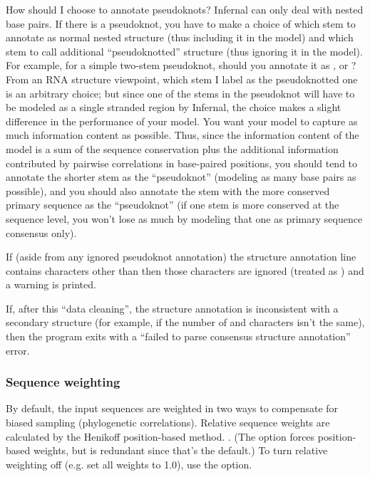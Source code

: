 \begin{srefaq}{How should I choose to annotate pseudoknots?} 
Infernal can only deal with nested base pairs. If there is
a pseudoknot, you have to make a choice of which stem to annotate as
normal nested structure (thus including it in the model) and which
stem to call additional ``pseudoknotted'' structure (thus ignoring it
in the model). For example, for a simple two-stem pseudoknot, should
you annotate it as , or
?  From an RNA structure viewpoint, which
stem I label as the pseudoknotted one is an arbitrary choice; but
since one of the stems in the pseudoknot will have to be modeled as a
single stranded region by Infernal, the choice makes a
slight difference in the performance of your model. You want your
model to capture as much information content as possible.  Thus, since
the information content of the model is a sum of the sequence
conservation plus the additional information contributed by pairwise
correlations in base-paired positions, you should tend to annotate the
shorter stem as the ``pseudoknot'' (modeling as many base pairs as
possible), and you should also annotate the stem with the more
conserved primary sequence as the ``pseudoknot'' (if one stem is more
conserved at the sequence level, you won't lose as much by modeling
that one as primary sequence consensus only).
\end{srefaq}

If (aside from any ignored pseudoknot annotation) the structure
annotation line contains characters other than 
then those characters are ignored (treated as ) and a warning
is printed.

If, after this ``data cleaning'', the structure annotation is
inconsistent with a secondary structure (for example, if the number of
\otext{<} and \otext{>} characters isn't the same), then the program
exits with a ``failed to parse consensus structure annotation'' error.

\subsubsection{Sequence weighting}

By default, the input sequences are weighted in two ways to compensate
for biased sampling (phylogenetic correlations).  Relative sequence
weights are calculated by the Henikoff position-based method.
\citep{Henikoff94b}.  (The  option forces position-based
weights, but is redundant since that's the default.)  To turn relative
weighting off (e.g. set all weights to 1.0), use the 
option.

